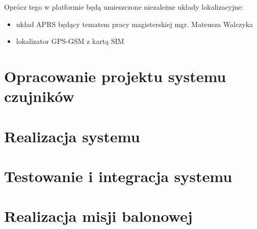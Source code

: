 \documentclass[a4paper,12pt]{article}
\begin{document}
Oprócz tego w platformie będą umieszczone niezależne układy lokalizacyjne:
\begin{itemize}
 \item układ APRS będący tematem pracy magisterskiej mgr. Mateusza Walczyka
 \item lokalizator GPS-GSM z kartą SIM
\end{itemize}

 
\section{Opracowanie projektu systemu czujników}
\section{Realizacja systemu}
\section{Testowanie i integracja systemu}
\section{Realizacja misji balonowej}
\end{document}
